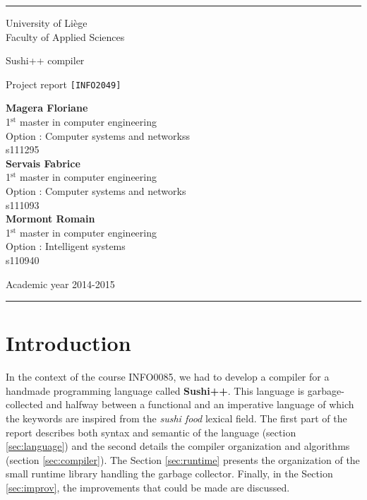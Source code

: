 \documentclass[a4paper,11pt]{article}
\begin{document}
\thispagestyle{empty}
\rule{1\linewidth}{1px}
{ \sc
\begin{center}
{\small University of Liège}\\
{\small Faculty of Applied Sciences}

\end{center}

\vfill
\begin{center}

{\Huge Sushi++ compiler\\}
\end{center}
\begin{center}
{\Huge Project report  {\LARGE \tt [INFO2049]} }
\end{center}
\begin{center}
\textbf{Magera Floriane}\\
{\small 1$^{\text{st}}$ master in computer engineering}\\
{\small Option : Computer systems and networkss}\\
{\small s111295} \\ 
\textbf{Servais Fabrice}\\
{\small 1$^{\text{st}}$ master in computer engineering}\\
{\small Option : Computer systems and networks}\\
{\small s111093} \\ 
\textbf{Mormont Romain}\\
{\small 1$^{\text{st}}$ master in computer engineering}\\
{\small Option : Intelligent systems}\\
{\small s110940} \\ 
\end{center}

\vfill
\begin{center}
Academic year 2014-2015\\
\end{center}
}
\rule{1\linewidth}{1px}
\newpage
\thispagestyle{empty}
\tableofcontents
\newpage
\setcounter{page}{1}
\section{Introduction}
In the context of the course INFO0085, we had to develop a compiler for a handmade programming language called \textbf{Sushi++}. This language is garbage-collected and halfway between a functional and an imperative language of which the keywords are inspired from the \textit{sushi food} lexical field. The first part of the report describes both syntax and semantic of the language (section \ref{sec:language}) and the second details the compiler organization and algorithms (section \ref{sec:compiler}). The Section \ref{sec:runtime} presents the organization of the small runtime library handling the garbage collector. Finally, in the Section \ref{sec:improv}, the improvements that could be made are discussed. 
\end{document}

